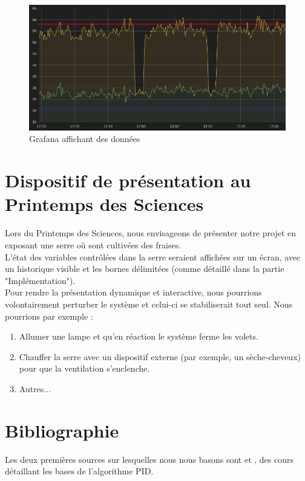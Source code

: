 \documentclass[a4paper,10pt]{article}
\begin{document}
\thispagestyle{empty}
\begin{figure}[H]
\centering
\includegraphics[scale=0.5]{figures/Grafana.png}
\caption{Grafana affichant des données}
\label{grafana}
\end{figure}

\section{Dispositif de présentation au Printemps des Sciences}

Lors du Printemps des Sciences, nous envisageons de présenter notre projet en exposant une serre où sont cultivées des fraises. \\

L'état des variables contrôlées dans la serre seraient affichées sur un écran, avec un historique visible et les bornes délimitées (comme détaillé dans la partie "Implémentation"). \\

Pour rendre la présentation dynamique et interactive, nous pourrions volontairement perturber le système et celui-ci se stabiliserait tout seul. Nous pourrions par exemple :
\begin{enumerate}
	\item Allumer une lampe et qu'en réaction le système ferme les volets.
	\item Chauffer la serre avec un dispositif externe (par exemple, un sèche-cheveux) pour que la ventilation s'enclenche.
	\item Autres... \\
\end{enumerate}

\section{Bibliographie}

Les deux premières sources sur lesquelles nous nous basons sont  \cite{Kinnaert2013} et  \cite{Knospe2006}, des cours détaillant les bases de l'algorithme PID. \\
\end{document}
